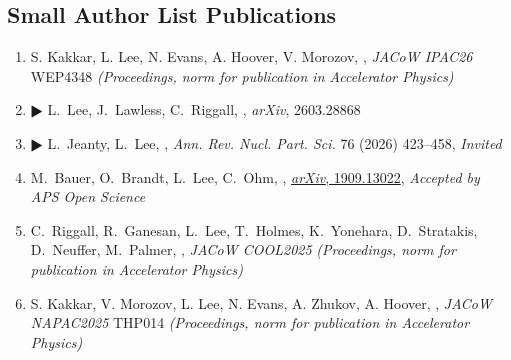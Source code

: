   \subsection*{Small Author List Publications}
  \begin{enumerate}

    \item S. Kakkar, L. Lee, N. Evans, A. Hoover, V. Morozov, , \emph{JACoW IPAC26} WEP4348 \newline \emph{(Proceedings, norm for publication in Accelerator Physics)} 

    \item $\RHD$ L.~Lee, J.~Lawless, C.~Riggall, , \emph{arXiv}, 2603.28868 

    \item $\RHD$ L.~Jeanty, L.~Lee, , \emph{Ann. Rev. Nucl. Part. Sci.} 76 (2026) 423--458, \emph{Invited} 

    \item M.~Bauer, O.~Brandt, L.~Lee, C.~Ohm, , \href{https://arxiv.org/abs/1909.13022}{\emph{arXiv}, 1909.13022}, \emph{Accepted by APS Open Science}


    \item C.~Riggall, R.~Ganesan, L.~Lee, T.~Holmes, K.~Yonehara, D.~Stratakis, D.~Neuffer, M.~Palmer, , \emph{JACoW COOL2025} \newline \emph{(Proceedings, norm for publication in Accelerator Physics)}  %

    \item S. Kakkar, V. Morozov, L. Lee, N. Evans, A. Zhukov, A. Hoover, , \emph{JACoW NAPAC2025} THP014 \newline \emph{(Proceedings, norm for publication in Accelerator Physics)} 


\end{enumerate}

